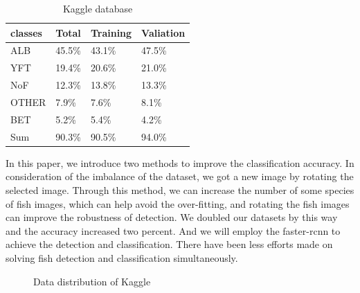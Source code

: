 \documentclass[conference]{IEEEtran}
\begin{document}
\begin{table}[t]
  \caption{Kaggle database}
  \label{table:table1}
  \centering
  \begin{tabular}{llll}
    \toprule
    \cmidrule{1-4}
    classes     & Total     & Training   &Valiation \\
    \hline
    ALB & 45.5\%  & 43.1\%  & 47.5\%     \\
    YFT     & 19.4\% & 20.6\%   &21.0\%    \\
    NoF     & 12.3\%   & 13.8\% &13.3\% \\
    OTHER & 7.9\% & 7.6\% & 8.1\% \\
    BET & 5.2\% & 5.4\% & 4.2\% \\ 
    \toprule 
    Sum & 90.3\% & 90.5\% & 94.0\% \\  
    \bottomrule
  \end{tabular}
\end{table}



In this paper, we introduce two methods to improve the classification accuracy. In consideration of the imbalance of the dataset, we got a new image by rotating the selected image. Through this method, we can increase the number of some species of fish images, which can help avoid the over-fitting, and rotating the fish images can improve the robustness of detection. We doubled our datasets by this way and the accuracy increased two percent. And we will employ the faster-rcnn to achieve the detection and classification. There have been less efforts made on solving fish detection and classification simultaneously\cite{qin2015deepfish}. \par

\begin{figure}[!ht]
  
\centering
{}
  \hspace{0.05in}
  \hspace{0.05in}
  \caption{Data distribution of Kaggle}
  \label{fig:data}

\end{figure}
\end{document}
